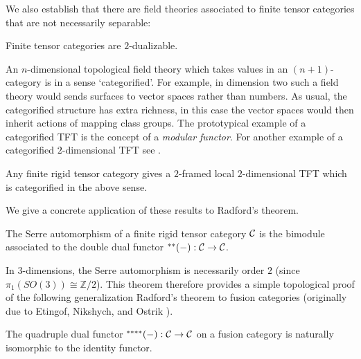 \documentclass{amsart}
\begin{document}
We also establish that there are field theories associated to finite tensor categories that are not necessarily separable:

\begin{maintheorem} \label{thm4}
Finite tensor categories are $2$-dualizable.
\end{maintheorem}

An $n$-dimensional topological field theory which takes values in an $(n+1)$-category is in a sense `categorified'.  For example, in dimension two such a field theory would sends surfaces to vector spaces rather than numbers.  As usual, the categorified structure has extra richness, in this case the vector spaces would then inherit actions of mapping class groups. The prototypical example of a categorified TFT is the concept of a {\em modular functor}.  For another example of a categorified $2$-dimensional TFT see \cite{0904.1247}.

\begin{maincor} \label{cor5}
Any finite rigid tensor category gives a $2$-framed local $2$-dimensional TFT which is categorified in the above sense. 
\end{maincor}

We give a concrete application of these results to Radford's theorem.

\begin{maintheorem} \label{thm6}
The Serre automorphism of a finite rigid tensor category $\mathcal C$ is the bimodule associated to the double dual functor ${}^{**}(-): \mathcal C \rightarrow \mathcal C$.  %
\end{maintheorem}

In $3$-dimensions, the Serre automorphism is necessarily order $2$ (since $\pi_1(SO(3)) \cong \mathbb{Z}/2$). This theorem therefore provides a simple topological proof of the following generalization Radford's theorem \cite{MR0407069} to fusion categories (originally due to Etingof, Nikshych, and Ostrik \cite{MR2183279}).
\begin{maincor} \label{cor7}
The quadruple dual functor ${}^{****}(-): \mathcal C \rightarrow \mathcal C$ on a fusion category is naturally isomorphic to the identity functor.
\end{maincor}
\end{document}
